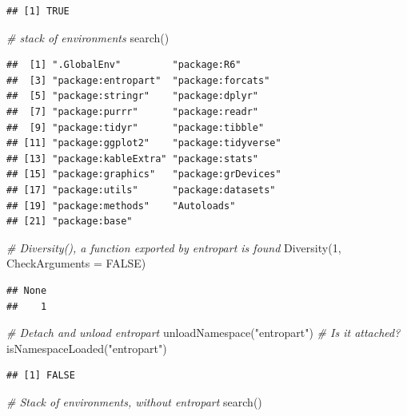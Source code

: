 \documentclass[
  12pt,
  american,
  a4paper,
  extrafontsizes,onecolumn,openright
  ]{memoir}
\newenvironment{Shaded}{\begin{snugshade}}{\end{snugshade}}
\newcommand{\AttributeTok}[1]{\textcolor[rgb]{0.77,0.63,0.00}{#1}}
\newcommand{\CommentTok}[1]{\textcolor[rgb]{0.56,0.35,0.01}{\textit{#1}}}
\newcommand{\ConstantTok}[1]{\textcolor[rgb]{0.00,0.00,0.00}{#1}}
\newcommand{\DecValTok}[1]{\textcolor[rgb]{0.00,0.00,0.81}{#1}}
\newcommand{\FunctionTok}[1]{\textcolor[rgb]{0.00,0.00,0.00}{#1}}
\newcommand{\NormalTok}[1]{#1}
\newcommand{\StringTok}[1]{\textcolor[rgb]{0.31,0.60,0.02}{#1}}
\begin{document}
\begin{verbatim}
## [1] TRUE
\end{verbatim}

\begin{Shaded}
\begin{Highlighting}[]
\CommentTok{\# stack of environments}
\FunctionTok{search}\NormalTok{()}
\end{Highlighting}
\end{Shaded}

\begin{verbatim}
##  [1] ".GlobalEnv"         "package:R6"        
##  [3] "package:entropart"  "package:forcats"   
##  [5] "package:stringr"    "package:dplyr"     
##  [7] "package:purrr"      "package:readr"     
##  [9] "package:tidyr"      "package:tibble"    
## [11] "package:ggplot2"    "package:tidyverse" 
## [13] "package:kableExtra" "package:stats"     
## [15] "package:graphics"   "package:grDevices" 
## [17] "package:utils"      "package:datasets"  
## [19] "package:methods"    "Autoloads"         
## [21] "package:base"
\end{verbatim}

\begin{Shaded}
\begin{Highlighting}[]
\CommentTok{\# Diversity(), a function exported by entropart is found}
\FunctionTok{Diversity}\NormalTok{(}\DecValTok{1}\NormalTok{, }\AttributeTok{CheckArguments =} \ConstantTok{FALSE}\NormalTok{)}
\end{Highlighting}
\end{Shaded}

\begin{verbatim}
## None 
##    1
\end{verbatim}

\begin{Shaded}
\begin{Highlighting}[]
\CommentTok{\# Detach and unload entropart}
\FunctionTok{unloadNamespace}\NormalTok{(}\StringTok{"entropart"}\NormalTok{)}
\CommentTok{\# Is it attached?}
\FunctionTok{isNamespaceLoaded}\NormalTok{(}\StringTok{"entropart"}\NormalTok{)}
\end{Highlighting}
\end{Shaded}

\begin{verbatim}
## [1] FALSE
\end{verbatim}

\begin{Shaded}
\begin{Highlighting}[]
\CommentTok{\# Stack of environments, without entropart}
\FunctionTok{search}\NormalTok{()}
\end{Highlighting}
\end{Shaded}
\end{document}
